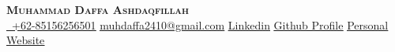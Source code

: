 \begin{center}
    \textbf{\Huge \scshape Muhammad Daffa Ashdaqfillah} \\ \vspace{1pt}
    \vspace{5pt} %
    \href{https://wa.me/6285156256501}{ \ \small \underline{+62-85156256501}} \quad
    \href{mailto:muhdaffa2410@gmail.com}{ \underline{muhdaffa2410@gmail.com}} \quad
    \href{https://www.linkedin.com/in/daf2a}{ \underline{Linkedin}} \quad
    \href{https://github.com/daf2a}{ \underline{Github Profile}} \quad
    \href{https://daf2a.github.io}{ \underline{Personal Website}}
\end{center}
